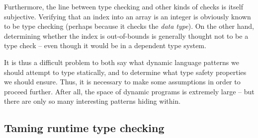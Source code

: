 Furthermore, the line between type checking and other kinds of checks is itself subjective.
Verifying that an index into an array is an integer is obviously known to be type checking (perhaps because it checks the \emph{data type}).
On the other hand, determining whether the index is out-of-bounds is generally thought not to be a type check -- even though it would be in a dependent type system. 

It is thus a difficult problem to both say what dynamic language patterns we should attempt to type statically, and to determine what type safety properties we should ensure. Thus, it is necessary to make some assumptions in order to proceed further.
After all, the space of dynamic programs is extremely large -- but there are only so many interesting patterns hiding within.

\subsection{Taming runtime type checking}
\label{subsec:runtime-type-checking}


